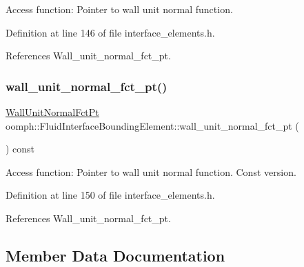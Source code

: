 Access function\+: Pointer to wall unit normal function. 



Definition at line 146 of file interface\+\_\+elements.\+h.



References Wall\+\_\+unit\+\_\+normal\+\_\+fct\+\_\+pt.

\mbox{\label{classoomph_1_1FluidInterfaceBoundingElement_a393601b322d0b8d6d2f86d07bd17550f}} 
\subsubsection{\texorpdfstring{wall\+\_\+unit\+\_\+normal\+\_\+fct\+\_\+pt()}{wall\_unit\_normal\_fct\_pt()}\hspace{0.1cm}{\footnotesize\ttfamily [2/2]}}
{\footnotesize\ttfamily \hyperlink{classoomph_1_1FluidInterfaceBoundingElement_a09c0b1df7d653eaf55e94e3951d409dd}{Wall\+Unit\+Normal\+Fct\+Pt} oomph\+::\+Fluid\+Interface\+Bounding\+Element\+::wall\+\_\+unit\+\_\+normal\+\_\+fct\+\_\+pt (\begin{DoxyParamCaption}{ }\end{DoxyParamCaption}) const\hspace{0.3cm}{\ttfamily [inline]}}



Access function\+: Pointer to wall unit normal function. Const version. 



Definition at line 150 of file interface\+\_\+elements.\+h.



References Wall\+\_\+unit\+\_\+normal\+\_\+fct\+\_\+pt.



\subsection{Member Data Documentation}
\mbox{\label{classoomph_1_1FluidInterfaceBoundingElement_abf47719443253c1117705b0a20e9ef70}} 
